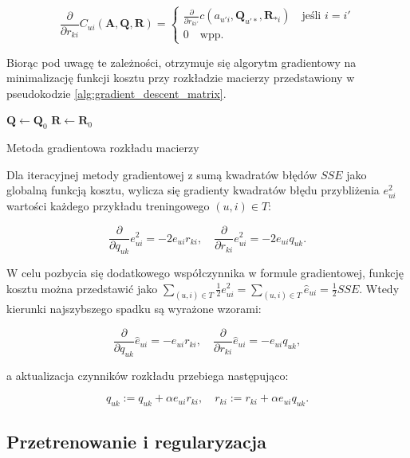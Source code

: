 \documentclass{pracamgr}
\begin{document}
\[
\frac{\partial}{\partial r_{ki}} C_{ui}(\mathbf{A}, \mathbf{Q}, \mathbf{R}) = \begin{cases}
    \frac{\partial}{\partial r_{ki'}} c(a_{u'i}, \mathbf{Q}_{u' \ast}, \mathbf{R}_{\ast i}) \quad \text{jeśli $i = i'$} \\
    0 \quad \text{wpp}.
\end{cases}
\]

Biorąc pod uwagę te zależności, otrzymuje się algorytm gradientowy na minimalizację funkcji kosztu przy rozkładzie macierzy przedstawiony w pseudokodzie \ref{alg:gradient_descent_matrix}.

\begin{algorithm}

$\mathbf{Q} \gets \mathbf{Q}_0$\;
$\mathbf{R} \gets \mathbf{R}_0$\;
\caption{Metoda gradientowa rozkładu macierzy}
\label{alg:gradient_descent_matrix}
\end{algorithm}

Dla iteracyjnej metody gradientowej z sumą kwadratów błędów $SSE$ jako globalną funkcją kosztu, wylicza się gradienty kwadratów błędu przybliżenia $e_{ui}^2$ wartości każdego przykładu treningowego $(u,i) \in T$:

\[
\frac{\partial}{\partial q_{uk}}e_{ui}^2 = -2e_{ui} r_{ki}, \quad
\frac{\partial}{\partial r_{ki}}e_{ui}^2 = -2e_{ui} q_{uk}.
\]

W celu pozbycia się dodatkowego współczynnika w formule gradientowej, funkcję kosztu można przedstawić jako $\sum_{(u,i) \in T} \frac{1}{2} e_{ui}^2 = \sum_{(u,i) \in T} \hat{e}_{ui} = \frac{1}{2} SSE$. Wtedy kierunki najszybszego spadku są wyrażone wzorami:

\[
\frac{\partial}{\partial q_{uk}}\hat{e}_{ui} = -e_{ui} r_{ki}, \quad
\frac{\partial}{\partial r_{ki}}\hat{e}_{ui} = -e_{ui} q_{uk},
\]

a aktualizacja czynników rozkładu przebiega następująco:

\[
q_{uk} := q_{uk} + \alpha e_{ui} r_{ki}, \quad
r_{ki} := r_{ki} + \alpha e_{ui} q_{uk}.
\]

\subsection{Przetrenowanie i regularyzacja}
\end{document}
